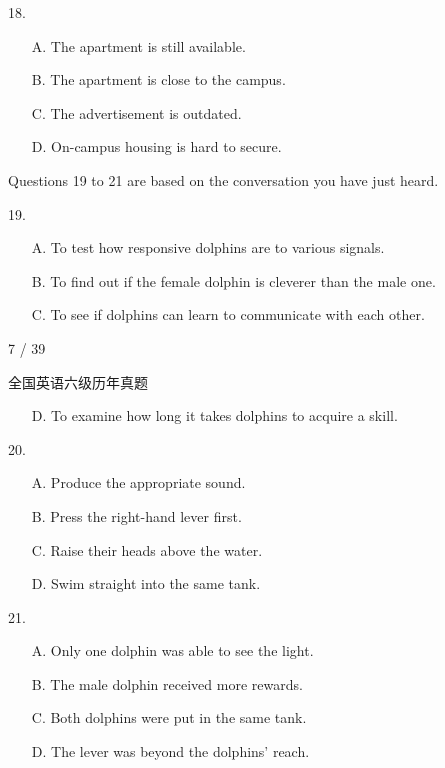 \documentclass[UTF8,11pt]{ctexart}
\begin{document}
18.


\begin{itemize}[leftmargin=2em,itemsep=.2em,topsep=.4em]\item[A.] The apartment is still available.
\item[B.] The apartment is close to the campus.
\item[C.] The advertisement is outdated.
\item[D.] On-campus housing is hard to secure.
\end{itemize}

Questions 19 to 21 are based on the conversation you have just heard.


19.


\begin{itemize}[leftmargin=2em,itemsep=.2em,topsep=.4em]\item[A.] To test how responsive dolphins are to various signals.
\item[B.] To find out if the female dolphin is cleverer than the male one.
\item[C.] To see if dolphins can learn to communicate with each other.
\end{itemize}

7 / 39


全国英语六级历年真题


\begin{itemize}[leftmargin=2em,itemsep=.2em,topsep=.4em]\item[D.] To examine how long it takes dolphins to acquire a skill.
\end{itemize}

20.


\begin{itemize}[leftmargin=2em,itemsep=.2em,topsep=.4em]\item[A.] Produce the appropriate sound.
\item[B.] Press the right-hand lever first.
\item[C.] Raise their heads above the water.
\item[D.] Swim straight into the same tank.
\end{itemize}

21.


\begin{itemize}[leftmargin=2em,itemsep=.2em,topsep=.4em]\item[A.] Only one dolphin was able to see the light.
\item[B.] The male dolphin received more rewards.
\item[C.] Both dolphins were put in the same tank.
\item[D.] The lever was beyond the dolphins’ reach.
\end{itemize}
\end{document}
